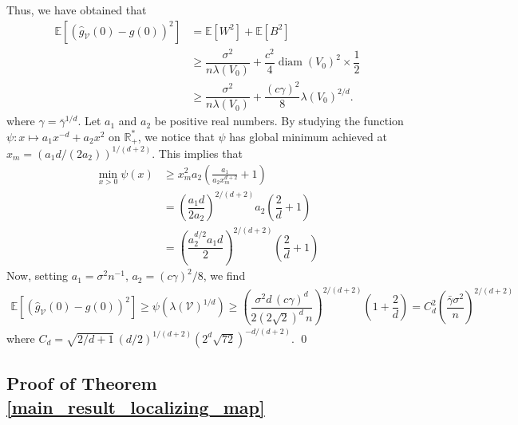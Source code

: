 \documentclass[paper=a4, fontsize=11pt]{scrartcl}
\newcommand{\diam}{\operatorname{diam}}
\newcommand{\EE}{\mathbb{E}}
\begin{document}
Thus, we have obtained that
\begin{align*}
    \EE [ (\hat g_{\mathcal V} (0 ) -  g(0 ))^2 ]  &= \EE[W^2] + \EE [B^2] \\ 
    &\geq \dfrac{\sigma^2}{n \lambda (  V_0)} + \dfrac{ c ^2}{4} 
     \diam ( V_0)^2 \times \dfrac 1 2  \\
    &\geq \dfrac{\sigma^2}{n \lambda (  V_0)} + \dfrac{(c \gamma)^2}{8} \lambda ( V_ 0)^{2/d}. 
\end{align*}
where $\gamma = \overline \gamma ^{1/d} $. Let \( a_1 \) and \( a_2 \) be positive real numbers. By studying the function \( \psi : x \mapsto a_1x^{-d} + a_2 x^2 \) on \(\mathbb R_+^*  \), we notice that \( \psi \) has global minimum achieved at \( x_m = (a_1d/(2a_2))^{1/(d+2)} \). This implies that \begin{align*}
\min_{x > 0} \psi (x) &\geq x_m^2 a_2 \left( \frac{ a_1 } {a_2x_m^{d +2 } }  + 1\right) 
\\ &= \left(\dfrac{a_1d}{2a_2}\right)^{2/(d+2)} a_2 \left( \dfrac{2}{d} +1  \right) 
\\ &= \left(\dfrac{a_2^{d/2}  a_1  d}{2}\right)^{2/(d+2)}  \left( \dfrac{2}{d} +1 \right)
\end{align*}
Now, setting \( a_1 = \sigma^2 n^{-1} \), \( a_2 = (c \gamma)^2/8 \), we find \begin{align*}
    \EE [ (\hat g_{\mathcal V} (0 ) -  g(0 ))^2 ] \geq \psi ( \lambda (\mathcal V)^{1/d}) \geq
    \left(\dfrac{\sigma^{2} d \, (c \gamma)^{d}}{2 (2\sqrt{2})^d \, n}\right)^{2/(d+2)} \left(1 + \dfrac{2}{d}\right)  = C_d ^2 \left(\dfrac{\bar\gamma \sigma^2}{n}\right)^{2/(d+2)}
\end{align*} where $C_d =  \sqrt{{2}/{d} + 1} \, \left({ d}/{2}\right)^{1/(d+2)} \left( {2^d \sqrt{72}}\right)^{-d/(d+2)}.$
\qed

\subsection*{Proof of Theorem \ref{main_result_localizing_map}}
\end{document}
